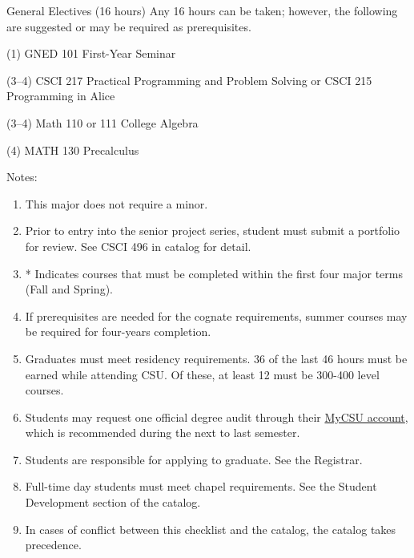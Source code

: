 \begin{reqgroup}{General Electives (16 hours)}
Any 16 hours can be taken; however, the following are suggested or may be required as prerequisites.
\begin{checklist}
\begin{minipage}[t]{\linewidth}
	\item (1)	GNED 101	First-Year Seminar
	\item (3--4)	CSCI 217	Practical Programming and Problem Solving or CSCI 215	Programming in Alice
	\item (3--4) Math 110 or 111 College Algebra
	\item (4) MATH 130 Precalculus
	\blankReq
\end{minipage}
\end{checklist}
\end{reqgroup}

Notes:%
\begin{enumerate}\footnotesize
	\item This major does not require a minor.
	\item Prior to entry into the senior project series, student must submit a portfolio for review. See CSCI 496 in catalog for detail.
	\item * Indicates courses that must be completed within the first four major terms (Fall and Spring).
	\item If prerequisites are needed for the cognate requirements, summer courses may be required for four-years completion.
	\item Graduates must meet residency requirements. 36 of the last 46 hours must be earned while attending CSU. Of these, at least 12 must be 300-400 level courses.
	\item Students may request one official degree audit through their \href{https://portal.csuniv.edu/}{MyCSU account}, which is recommended during the next to last semester.
	\item Students are responsible for applying to graduate. See the Registrar.
	\item Full-time day students must meet chapel requirements. See the Student Development section of the catalog.
	\item In cases of conflict between this checklist and the catalog, the catalog takes precedence.
\end{enumerate}